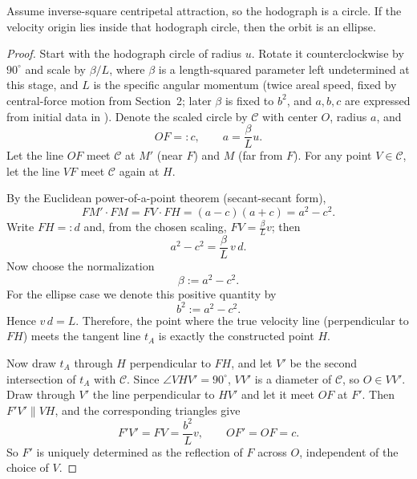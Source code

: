 \begin{proposition}
Assume inverse-square centripetal attraction, so the hodograph is a circle. If the velocity origin lies inside that hodograph circle, then the orbit is an ellipse.
\end{proposition}

\begin{proof}
Start with the hodograph circle of radius $u$. Rotate it counterclockwise by $90^\circ$ and scale by \(\beta/L\), where \(\beta\) is a length-squared parameter left undetermined at this stage, and \(L\) is the specific angular momentum (twice areal speed, fixed by central-force motion from Section~2; later \(\beta\) is fixed to \(b^2\), and \(a,b,c\) are expressed from initial data in ). Denote the scaled circle by $\mathcal C$ with center $O$, radius $a$, and
\[
  OF=:c,
  \qquad
  a=\frac{\beta}{L}u.
\]
Let the line $OF$ meet $\mathcal C$ at $M'$ (near $F$) and $M$ (far from $F$). For any point $V\in\mathcal C$, let the line $VF$ meet $\mathcal C$ again at $H$.

By the Euclidean power-of-a-point theorem (secant-secant form),
\[
  FM'\cdot FM = FV\cdot FH = (a-c)(a+c)=a^2-c^2.
\]
Write $FH=:d$ and, from the chosen scaling, $FV=\frac{\beta}{L}v$; then
\[
  a^2-c^2=\frac{\beta}{L}\,v\,d.
\]
Now choose the normalization
\[
  \beta:=a^2-c^2.
\]
For the ellipse case we denote this positive quantity by
\[
  b^2:=a^2-c^2.
\]
Hence $v\,d=L$. Therefore, the point where the true velocity line (perpendicular to $FH$) meets the tangent line $t_A$ is exactly the constructed point $H$.

Now draw $t_A$ through $H$ perpendicular to $FH$, and let $V'$ be the second intersection of $t_A$ with $\mathcal C$. Since $\angle VHV'=90^\circ$, $VV'$ is a diameter of $\mathcal C$, so $O\in VV'$. Draw through $V'$ the line perpendicular to $HV'$ and let it meet $OF$ at $F'$. Then $F'V'\parallel VH$, and the corresponding triangles give
\[
  F'V'=FV=\frac{b^2}{L}v,
  \qquad
  OF'=OF=c.
\]
So $F'$ is uniquely determined as the reflection of $F$ across $O$, independent of the choice of $V$.


\end{proof}
